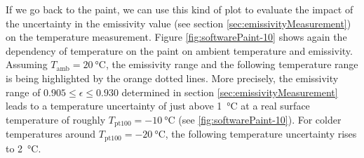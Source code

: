 If we go back to the paint, we can use this kind of plot to evaluate the impact of the uncertainty in the emissivity value (see section \ref{sec:emissivityMeasurement}) on the temperature measurement. Figure \ref{fig:softwarePaint-10} shows again the dependency of temperature on the paint on ambient temperature and emissivity. Assuming $T_\text{amb}=\SI{20}{\degreeCelsius}$, the emissivity range and the following temperature range is being highlighted by the orange dotted lines. More precisely, the emissivity range of $0.905\leq\epsilon\leq0.930$ determined in section \ref{sec:emissivityMeasurement} leads to a temperature uncertainty of just above \SI{1}{\degreeCelsius} at a real surface temperature of roughly $T_\text{pt100} = \SI{-10}{\degreeCelsius}$ (see \ref{fig:softwarePaint-10}). For colder temperatures around $T_\text{pt100} = \SI{-20}{\degreeCelsius}$, the following temperature uncertainty rises to \SI{2}{\degreeCelsius}.
